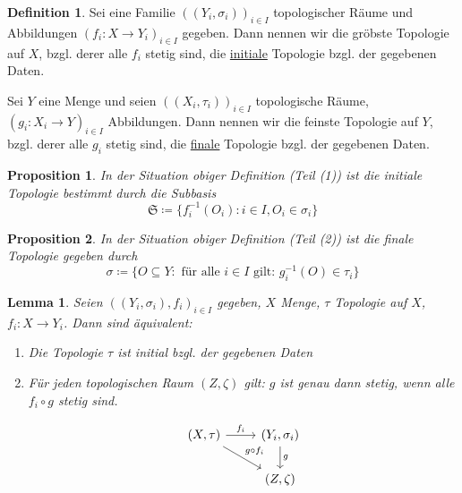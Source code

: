\documentclass[12pt]{scrartcl}%
\newtheorem{prop}{Proposition}
\newtheorem{lemma}{Lemma}
\theoremstyle{definition}
\newtheorem*{defn}{Definition}
\theoremstyle{remark}
\newcommand\Inv[1]{#1^{-1}}
\begin{document}
\begin{defn}
    Sei eine Familie $((Y_i,\sigma_i))_{i\in I}$ topologischer Räume und Abbildungen $(f_i: X\to Y_i)_{i\in I}$ gegeben. Dann nennen wir die gröbste Topologie auf $X$, bzgl. derer alle $f_i$ stetig sind, die \underline{initiale} Topologie bzgl. der gegebenen Daten.

    Sei $Y$ eine Menge und seien $((X_i,\tau_i))_{i\in I}$ topologische Räume, $(g_i:X_i\to Y)_{i\in I}$ Abbildungen. Dann nennen wir die feinste Topologie auf $Y$, bzgl. derer alle $g_i$ stetig sind, die \underline{finale} Topologie bzgl. der gegebenen Daten.
\end{defn}

\begin{prop}
    In der Situation obiger Definition (Teil (1)) ist die initiale Topologie bestimmt durch die Subbasis $$\mathfrak{S}\coloneqq \{ \Inv f_i(O_i): i\in I, O_i\in \sigma_i \}$$
\end{prop}

\begin{prop}
    In der Situation obiger Definition (Teil (2)) ist die finale Topologie gegeben durch $$\sigma \coloneqq \{ O\subseteq Y: \text{ für alle } i\in I \text{ gilt: } \Inv g_i(O)\in \tau_i \}$$
\end{prop}

\begin{lemma}
    Seien $((Y_i,\sigma_i), f_i)_{i\in I}$ gegeben, $X$ Menge, $\tau$ Topologie auf $X$, $f_i:X\to Y_i$. Dann sind äquivalent:

    \begin{enumerate}[label=(\arabic*)]
        \item Die Topologie $\tau$ ist initial bzgl. der gegebenen Daten
        \item Für jeden topologischen Raum $(Z,\zeta)$ gilt: $g$ ist genau dann stetig, wenn alle $f_i\circ g$ stetig sind.

            \[ \begin{tikzcd}
                    (X,\tau) \arrow[rd, "g\circ f_i"] \arrow[r,"f_i"] & (Y_i,\sigma_i) \arrow[d, "g"] \\
                                             & (Z,\zeta)
            \end{tikzcd} \]
    \end{enumerate}
\end{lemma}
\end{document}

